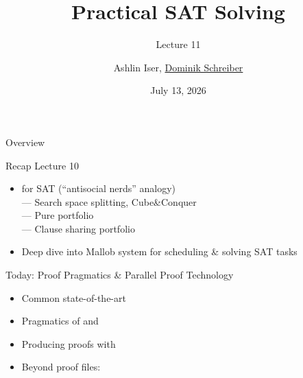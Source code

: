 \documentclass[t,english]{sdqbeamer}
\title{Practical SAT Solving}
\subtitle{Lecture 11 \unimp{\normalfont -- Proof Pragmatics \& Parallel Proof Technology}}
\author{{Ashlin Iser}, \underline{Dominik Schreiber}}
\date{July 13, 2026}
\begin{document}
\begin{frame}[title white horizontal, picture=logos/blender-render, kitlogo=rgb]
	\titlepage
\end{frame}

\begin{frame}{Overview}
	\begin{block}{Recap Lecture 10}
		\begin{itemize}
			\item {} for SAT (``antisocial nerds'' analogy)\\
			--- Search space splitting, Cube\&Conquer\\
			--- Pure portfolio\\
			--- Clause sharing portfolio
			\item Deep dive into Mallob system for scheduling \& solving SAT tasks
		\end{itemize}
	\end{block}
	\begin{blueblock}{Today: Proof Pragmatics \& Parallel Proof Technology}
		\begin{itemize}
			\item Common state-of-the-art 
			\item Pragmatics of  and 
			\item Producing proofs with 
			\item Beyond proof files: 
		\end{itemize}
	\end{blueblock}
	
\end{frame}
\end{document}
